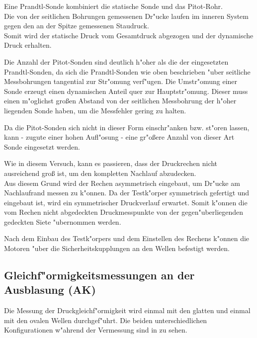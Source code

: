 Eine Prandtl-Sonde kombiniert die statische Sonde und das Pitot-Rohr.\\
Die von der seitlichen Bohrungen gemessenen Dr"ucke laufen im inneren System gegen den an der Spitze gemessenen Staudruck.\\
Somit wird der statische Druck vom Gesamtdruck abgezogen und der dynamische Druck erhalten.

Die Anzahl der Pitot-Sonden sind deutlich h"oher als die der eingesetzten Prandtl-Sonden, da sich die Prandtl-Sonden wie oben beschrieben "uber seitliche Messbohrungen tangential zur Str"omung verf"ugen. Die Umstr"omung einer Sonde erzeugt einen dynamischen Anteil quer zur Hauptstr"omung. Dieser muss einen m"oglichst gro\ss{}en Abstand von der seitlichen Messbohrung der h"oher liegenden Sonde haben, um die Messfehler gering zu halten.

Da die Pitot-Sonden sich nicht in dieser Form einschr"anken bzw. st"oren lassen, kann - zugute einer hohen Aufl"osung - eine gr"o\ss{}ere Anzahl von dieser Art Sonde eingesetzt werden.

Wie in diesem Versuch, kann es passieren, dass der Druckrechen nicht ausreichend gro\ss{} ist, um den kompletten Nachlauf abzudecken.\\
Aus diesem Grund wird der Rechen asymmetrisch eingebaut, um Dr"ucke am Nachlaufrand messen zu k"onnen. Da der Testk"orper symmetrisch gefertigt und eingebaut ist, wird ein symmetrischer Druckverlauf erwartet. Somit k"onnen die vom Rechen nicht abgedeckten Druckmesspunkte von der gegen"uberliegenden gedeckten Siete "ubernommen werden.

Nach dem Einbau des Testk"orpers und dem Einstellen des Rechens k"onnen die Motoren "uber die Sicherheitskupplungen an den Wellen befestigt werden.


\subsection{Gleichf"ormigkeitsmessungen an der Ausblasung (AK)}
\label{s:Gleichf"ormigkeitsmessungen}
Die Messung der Druckgleichf"ormigkeit wird einmal mit den glatten und einmal mit den ovalen Wellen durchgef"uhrt. Die beiden unterschiedlichen Konfigurationen w"ahrend der Vermessung sind in  zu sehen.

